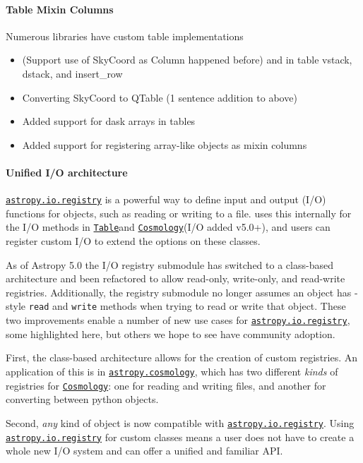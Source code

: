 \documentclass[modern]{aastex631}
\newcommand{\astropysubpkg}[1]{\href{http://docs.astropy.org/en/stable/#1/index.html}{\texttt{astropy.#1}}\xspace}
\newcommand{\astropyiosubpkg}[1]{\href{http://docs.astropy.org/en/stable/io/#1/index.html}{\texttt{astropy.io.#1}}\xspace}
\newcommand{\astropycosmology}{\astropysubpkg{cosmology}}
\newcommand{\astropyapi}[2]{\href{https://docs.astropy.org/en/stable/api/astropy.#1.html}{#2}}
\newcommand{\astropyapidoc}[2]{\astropyapi{#1}{\texttt{#2}\xspace}}
\newcommand{\astropyCosmology}{\astropyapidoc{cosmology.Cosmology}{Cosmology}}
\newcommand{\astropyTable}{\astropyapidoc{table.Table}{Table}}
\begin{document}
  \paragraph{Table Mixin Columns}

    Numerous \python libraries have custom table implementations
    \begin{itemize}
      \item (Support use of SkyCoord as Column happened before) and in table vstack, dstack, and insert\_row
      \item Converting SkyCoord to QTable (1 sentence addition to above)
      \item Added support for dask arrays in tables
      \item Added support for registering array-like objects as mixin columns
    \end{itemize}

  \paragraph{Unified I/O architecture}

    \astropyiosubpkg{registry} is a powerful way to define input and output
    (I/O) functions for \astropypkg objects, such as reading or writing to a
    file. \astropy uses this internally for the I/O methods in \astropyTable and
    \astropyCosmology (I/O added v5.0+), and users can register custom I/O to
    extend the options on these classes.

    As of Astropy 5.0 the I/O registry submodule has switched to a class-based
    architecture and been refactored to allow read-only, write-only, and
    read-write registries. Additionally, the registry submodule no longer
    assumes an object has \astropy-style \texttt{read} and \texttt{write}
    methods when trying to read or write that object. These two improvements
    enable a number of new use cases for \astropyiosubpkg{registry}, some
    highlighted here, but others we hope to see have community adoption.

    First, the class-based architecture allows for the creation of custom
    registries. An application of this is in \astropycosmology, which
    has two different \textit{kinds} of registries for \astropyCosmology: one
    for reading and writing files, and another for converting between python
    objects.

    Second, \textit{any} kind of object is now compatible with
    \astropyiosubpkg{registry}. Using \astropyiosubpkg{registry} for custom
    classes means a user does not have to create a whole new I/O system and can
    offer a unified and familiar API.
\end{document}

